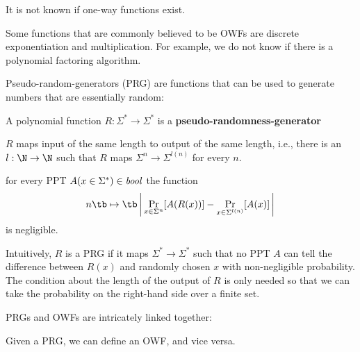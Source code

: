 \begin{example}
It is not known if one-way functions exist.

Some functions that are commonly believed to be OWFs are discrete exponentiation and multiplication.
For example, we do not know if there is a polynomial factoring algorithm.
\end{example}

Pseudo-random-generators (PRG) are functions that can be used to generate numbers that are essentially random:
\begin{definition}
 A polynomial function $R:\Sigma^*\to\Sigma^*$ is a \textbf{pseudo-randomness-generator}
 \begin{compactitem}
   \item $R$ maps input of the same length to output of the same length, i.e., there is an $l:\N\to\N$ such that $R$ maps $\Sigma^n\to\Sigma^{l(n)}$ for every $n$.
   \item for every PPT $A(x\in\Sigma^*)\in\mathit{bool}$ the function
  \[n \tb\mapsto \tb \left|\,\Prob{x\in\Sigma^n}{A(R(x))}-\Prob{x\in\Sigma^{l(n)}}{A(x)}\,\right|\]
  is negligible.
 \end{compactitem}
\end{definition}

Intuitively, $R$ is a PRG if it maps $\Sigma^*\to\Sigma^*$ such that no PPT $A$ can tell the difference between $R(x)$ and randomly chosen $x$ with non-negligible probability.
The condition about the length of the output of $R$ is only needed so that we can take the probability on the right-hand side over a finite set.

PRGs and OWFs are intricately linked together:
\begin{theorem}
Given a PRG, we can define an OWF, and vice versa.
\end{theorem}

%

